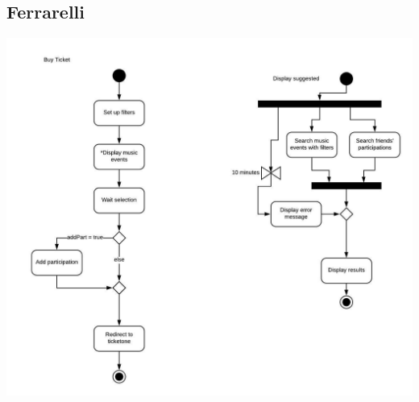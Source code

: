 \documentclass[11pt,a4paper]{article}
\begin{document}
\begin{itemize}
\subsection{Ferrarelli}
\includegraphics[scale=0.5]{hmwActivityDiagram.jpeg}

\end{itemize}
\end{document}

